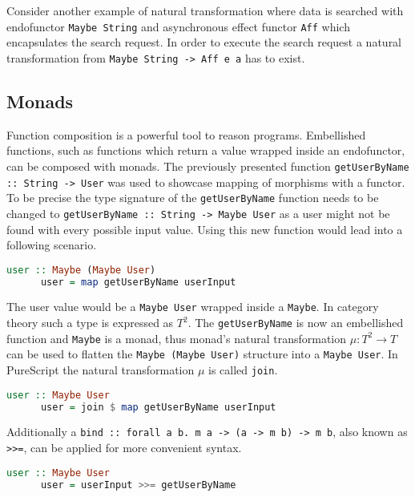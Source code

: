 \documentclass[article]{aaltoseries}
\begin{document}
    Consider another example of natural transformation where data is searched
    with endofunctor \lstinline|Maybe String| and asynchronous effect functor
    \lstinline|Aff| which encapsulates the search request. In order to execute
    the search request a natural transformation from
    \lstinline|Maybe String -> Aff e a| has to exist.


  \subsection{Monads}
    Function composition is a powerful tool to reason programs. Embellished
    functions, such as functions which return a value wrapped inside an
    endofunctor, can be composed with monads. The previously presented function
    \lstinline|getUserByName :: String -> User| was used to showcase mapping of
    morphisms with a functor. To be precise the type signature of the
    \lstinline|getUserByName| function needs to be changed to
    \lstinline|getUserByName :: String -> Maybe User| as a user might not be
    found with every possible input value. Using this new function would lead
    into a following scenario.
 
    \begin{lstlisting}[language=Haskell]
      user :: Maybe (Maybe User)
      user = map getUserByName userInput
    \end{lstlisting}
 
    The user value would be a \lstinline|Maybe User| wrapped inside a
    \lstinline|Maybe|. In category theory such a type is expressed as $T^2$. The
    \lstinline|getUserByName| is now an embellished function and
    \lstinline|Maybe| is a monad, thus monad’s natural transformation $\mu : T^2
    \rightarrow T$ can be used to flatten the \lstinline|Maybe (Maybe User)|
    structure into a \lstinline|Maybe User|. In PureScript the natural
    transformation $\mu$ is called \lstinline|join|.
 
    \begin{lstlisting}[language=Haskell]
      user :: Maybe User
      user = join $ map getUserByName userInput
    \end{lstlisting}
 
    Additionally a \lstinline|bind :: forall a b. m a -> (a -> m b) -> m b|,
    also known as \lstinline|>>=|, can be applied for more convenient syntax.
 
    \begin{lstlisting}[language=Haskell]
      user :: Maybe User
      user = userInput >>= getUserByName
    \end{lstlisting}
\end{document}
